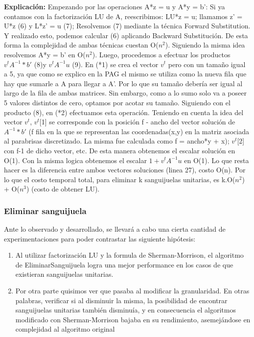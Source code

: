  \textbf{Explicación:}\newline  
Empezando por las operaciones A*z = u y A*y = b': \newline
Si ya contamos con la factorización LU de A, reescribimos:\newline
LU*z = u; \newline
llamamos z' = U*z (6) y L*z' = u (7);\newline
Resolvemos (7) mediante la técnica Forward Substitution. Y realizado esto, podemos calcular (6) aplicando Backward Substitución. De esta forma la complejidad de ambas técnicas cuestan O($n^2$). Siguiendo la misma idea resolvemos 
A*y = b' en O($n^2$). Luego, procedemos a efectuar los productos $v^t A^{-1}*b'$ (8)y $v^t A^{-1}u$ (9). En (*1) se crea el vector $v^t$ pero con un tamaño igual a 5, ya que como se explico en la PAG el mismo  se utiliza como la nueva fila que hay que sumarle a A para llegar a A'. Por lo que su tamaño debería ser igual al largo de la fila de ambas matrices. Sin embargo, como a lo sumo solo va a poseer 5 valores distintos de cero, optamos por acotar su tamaño. Siguiendo con el producto (8), en (*2) efectuamos esta operación. Teniendo en cuenta la idea del vector $v^t$, $v^t$[1] se corresponde con la posición f - ancho del vector solución de $A^{-1}*b'$ (f fila en la que se representan las coordenadas(x,y) en la matriz asociada al parabrisas discretizado. La misma fue calculada como f = ancho*y + x); $v^t$[2] con f-1 de dicho vector, etc. De esta manera obtenemos el escalar solución en O(1). Con la misma logica obtenemos el escalar $1+v^t A^{-1}u$ en O(1). Lo que resta hacer es la diferencia entre ambos vectores soluciones (linea 27), costo O(n). Por lo que el costo temporal total, para eliminar k sanguijuelas unitarias, es k.O($n^2$) + O($n^3$) (costo de obtener LU).\newline\newline






\subsubsection{Eliminar sanguijuela}
Ante lo observado y desarrollado, se llevará a cabo una cierta cantidad de experimentaciones para poder contrastar las siguiente  hipótesis:\\

\begin{enumerate}
\item Al utilizar factorización LU y la formula de Sherman-Morrison, el algoritmo de EliminarSanguijuela logra una mejor performance en los casos de que existieran sanguijuelas unitarias.
\item Por otra parte quisimos ver que pasaba al modificar la granularidad. En otras palabras, verificar si al disminuir la misma, la posibilidad de encontrar sanguijuelas unitarias también disminuía, y en consecuencia el algoritmos modificado con Sherman-Morrison bajaba en su rendimiento, asemejándose en complejidad al algoritmo original\\
\end{enumerate}



